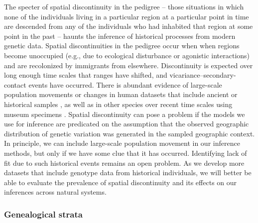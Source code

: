 \documentclass{ar-1col}
\begin{document}
The specter of spatial discontinuity in the pedigree 
-- those situations in which none of the individuals living in a particular region 
at a particular point in time are descended from any of the individuals 
who had inhabited that region at some point in the past 
-- haunts the inference of historical processes from modern genetic data.
Spatial discontinuities in the pedigree occur when when regions become unoccupied
(e.g., due to ecological disturbance or agonistic interactions) 
and are recolonized by immigrants from elsewhere. 
Discontinuity is expected over long enough time scales that ranges have shifted,
and vicariance--secondary-contact events have occurred.
There is abundant evidence of large-scale population movements or changes 
in human datasets that include ancient or historical samples 
\citep{skoglund2014investigating, PickrellReich2014, lazaridis_ancient_2014, haak2015massive, joseph2018inference},
as well as in other species over recent time scales using museum specimens \citep{bi2013unlocking,bi2019chipmunks}.
Spatial discontinuity can pose a problem 
if the models we use for inference are predicated on the assumption that 
the observed geographic distribution of genetic variation 
was generated in the sampled geographic context.
In principle, we can include large-scale population movement in our inference methods,
but only if we have some clue that it has occurred.
Identifying lack of fit due to such historical events
remains an open problem.
As we develop more datasets that include genotype data from historical individuals, 
we will better be able to evaluate the prevalence of spatial discontinuity 
and its effects on our inferences across natural systems. 

\subsubsection{Genealogical strata}
\end{document}

